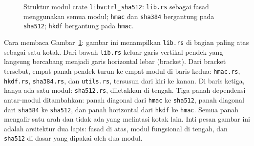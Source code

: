 \documentclass[11pt,a4paper]{article}
\begin{document}
\begin{figure}[H]
	\centering
	\caption{Struktur modul crate \texttt{libvctrl\_sha512}: \texttt{lib.rs} sebagai fasad menggunakan semua modul; \texttt{hmac} dan \texttt{sha384} bergantung pada \texttt{sha512}; \texttt{hkdf} bergantung pada \texttt{hmac}.}
	\label{fig:module-arch}
\end{figure}

Cara membaca Gambar~\ref{fig:module-arch}: gambar ini menampilkan \texttt{lib.rs} di bagian paling atas sebagai satu kotak. Dari bawah \texttt{lib.rs} keluar garis vertikal pendek yang langsung bercabang menjadi garis horizontal lebar (bracket). Dari bracket tersebut, empat panah pendek turun ke empat modul di baris kedua: \texttt{hmac.rs}, \texttt{hkdf.rs}, \texttt{sha384.rs}, dan \texttt{utils.rs}, tersusun dari kiri ke kanan. Di baris ketiga, hanya ada satu modul: \texttt{sha512.rs}, diletakkan di tengah. Tiga panah dependensi antar-modul ditambahkan: panah diagonal dari \texttt{hmac} ke \texttt{sha512}, panah diagonal dari \texttt{sha384} ke \texttt{sha512}, dan panah horizontal dari \texttt{hkdf} ke \texttt{hmac}. Semua panah mengalir satu arah dan tidak ada yang melintasi kotak lain. Inti pesan gambar ini adalah arsitektur dua lapis: fasad di atas, modul fungsional di tengah, dan \texttt{sha512} di dasar yang dipakai oleh dua modul.
\end{document}
